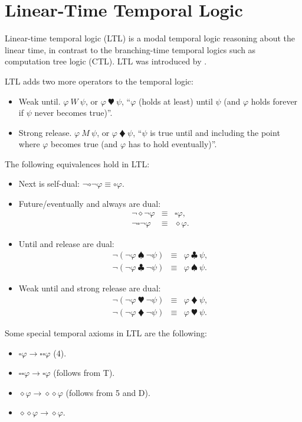 \section{Linear-Time Temporal Logic}

Linear-time temporal logic (LTL) is a modal temporal logic reasoning about the linear time, in contrast to the branching-time temporal logics such as computation tree logic (CTL). LTL was introduced by \cite{DBLP:conf/focs/Pnueli77}.

LTL adds two more operators to the temporal logic:
\begin{itemize}
    \item Weak until. $\varphi~W~\psi$, or $\varphi~\varheartsuit~\psi$, ``$\varphi$ (holds at least) until $\psi$ (and $\varphi$ holds forever if $\psi$ never becomes true)''.
    \item Strong release. $\varphi~M~\psi$, or $\varphi~\vardiamondsuit~\psi$, ``$\psi$ is true until and including the point where $\varphi$ becomes true (and $\varphi$ has to hold eventually)''.
\end{itemize}

The following equivalences hold in LTL:
\begin{itemize}
    \item Next is self-dual: $\neg\circ\neg\varphi \equiv \circ\varphi$.
    \item Future/eventually and always are dual:
    \begin{eqnarray*}
    \neg\diamond\neg\varphi &\equiv& \square\varphi, \\
    \neg\square\neg\varphi &\equiv& \diamond\varphi.
    \end{eqnarray*}
    \item Until and release are dual: 
    \begin{eqnarray*}
    \neg(\neg\varphi~\spadesuit~\neg\psi) &\equiv& \varphi~\clubsuit~\psi, \\
    \neg(\neg\varphi~\clubsuit~\neg\psi) &\equiv& \varphi~\spadesuit~\psi.
    \end{eqnarray*}
    \item Weak until and strong release are dual: 
    \begin{eqnarray*}
    \neg(\neg\varphi~\varheartsuit~\neg\psi) &\equiv& \varphi~\vardiamondsuit~\psi, \\
    \neg(\neg\varphi~\vardiamondsuit~\neg\psi) &\equiv& \varphi~\varheartsuit~\psi.
    \end{eqnarray*}
\end{itemize}

Some special temporal axioms in LTL are the following:
\begin{itemize}
    \item $\square\varphi \rightarrow \square\square\varphi$ (4).
    \item $\square\square\varphi \rightarrow \square\varphi$ (follows from T).
    \item $\diamond\varphi \rightarrow \diamond\diamond\varphi$ (follows from 5 and D). 
    \item $\diamond\diamond\varphi \rightarrow \diamond\varphi$.
\end{itemize}